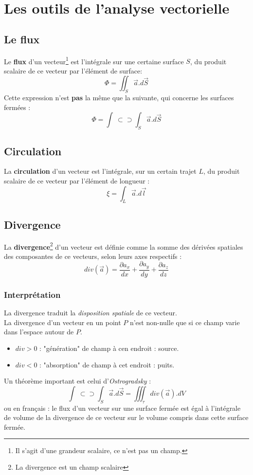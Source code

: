 \documentclass	[11pt, a4paper, openany]{book}
\newcommand{\oiint}{\int\!\!\!\!\!\!\! \:\!\subset\!\!\supset\!\!\!\!\!\!\!\int}
\begin{document}
\section{Les outils de l'analyse vectorielle}
\subsection{Le flux}
Le \textbf{flux} d'un vecteur\footnote{Il s'agit d'une grandeur scalaire, ce n'est pas un champ.} est l'intégrale sur une certaine surface $S$, du produit scalaire de ce vecteur par l'élément de surface:
\begin{equation}
\Phi = \iint_S \vec{a}.d\vec{S}
\end{equation}
Cette expression n'est \textbf{pas} la même que la suivante, qui concerne les surfaces fermées :
\begin{equation}
\Phi = \oiint_S \vec{a}.d\vec{S}
\end{equation}


\subsection{Circulation}
La \textbf{circulation} d'un vecteur est l'intégrale, sur un certain trajet $L$, du produit scalaire de ce vecteur par l'élément de longueur :
\begin{equation}
\xi = \int_L \vec{a}.d\vec{l}
\end{equation}

\subsection{Divergence}
La \textbf{divergence}\footnote{La divergence est un champ scalaire} d'un vecteur est définie comme la somme des dérivées spatiales des composantes de ce vecteurs, selon leurs axes respectifs :
\begin{equation}
div(\vec{a}) = \frac{\partial a_x}{dx} + \frac{\partial a_y}{dy} + \frac{\partial a_z}{dz}
\end{equation}

\subsubsection{Interprétation}
La divergence traduit la \textit{disposition spatiale} de ce vecteur.\\
La divergence d'un vecteur en un point $P$ n'est non-nulle que si ce champ varie dans l'espace autour de $P$.
\begin{itemize}
\item $div > 0$ : "génération" de champ à cen endroit : source.
\item $div < 0$ : "absorption" de champ à cet endroit : puits.
\end{itemize}
Un théorème important est celui d'\textit{Ostrogradsky} :
\begin{equation}
\oiint_S \vec{a}.d\vec{S} = \iiint_\tau div(\vec{a}).dV
\end{equation}
ou en français : le flux d'un vecteur sur une surface fermée est égal à l'intégrale de volume de la divergence de ce vecteur sur le volume compris dans cette surface fermée.
\end{document}

